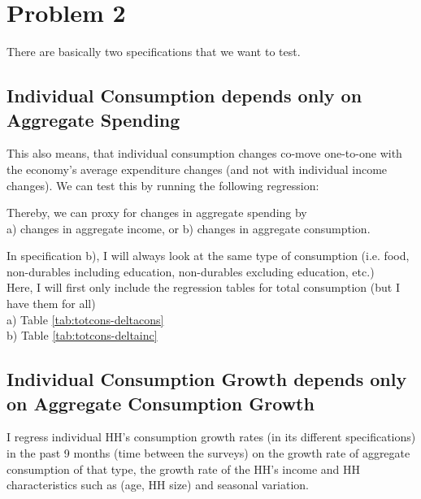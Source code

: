 \documentclass[12pt,a4paper]{article}
\begin{document}

\section*{Problem 2}

There are basically two specifications that we want to test. 

\subsection*{Individual Consumption depends only on Aggregate Spending}

This also means, that individual consumption changes co-move one-to-one with the economy's average expenditure changes (and not with individual income changes). We can test this by running the following regression:


Thereby, we can proxy for changes in aggregate spending by \\
a) changes in aggregate income, or
b) changes in aggregate consumption.

In specification b), I will always look at the same type of consumption (i.e. food, non-durables including education, non-durables excluding education, etc.) \\

Here, I will first only include the regression tables for total consumption (but I have them for all) \\

a) Table \ref{tab:totcons-deltacons}  \\
% 
% 
% 
% 


b) Table \ref{tab:totcons-deltainc}

% 
% 
% 
% 

\subsection*{Individual Consumption Growth depends only on Aggregate Consumption Growth}

I regress individual HH's consumption growth rates (in its different specifications) in the past 9 months (time between the surveys) on the growth rate of aggregate consumption of that type, the growth rate of the HH's income and HH characteristics such as (age, HH size) and seasonal variation. 
\end{document}
